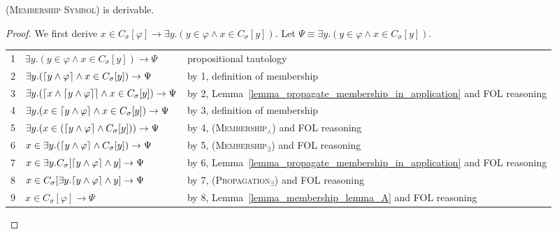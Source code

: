 \documentclass[acmsmall]{acmart}
\theoremstyle{acmdefinition}
\newcommand{\imp}{\to}
\newcommand{\CSub}[1]{C_{#1}}
\newcommand{\Csigmaapp}[1]{\CSub{\sigma}[#1]}
\newcommand{\prule}[1]{\textsc{(#1)}}
\newcommand{\propagationexists}{\prule{Propagation$_\exists$}\xspace}
\newcommand{\membershipwedge}{\prule{Membership$_\wedge$}\xspace}
\newcommand{\membershipexists}{\prule{Membership$_\exists$}\xspace}
\newcommand{\membershipsymbol}{\prule{Membership Symbol}\xspace}
\DeclarePairedDelimiter{\ceil}{\lceil}{\rceil}
\begin{document}
\begin{comment}

\begin{lemma}
\label{lemma_definedness_lemma_B}
For any pattern set $\Gamma$, any symbol $\sigma$, and pattern $\varphi$,
$\Gamma \vdash 
  \Csigmaapp{\ceil{y \wedge \varphi} \wedge y} =
  \Csigmaapp{y} \wedge \ceil{y \wedge \varphi}$,
where $y$ does not occur free in $\varphi$.
\end{lemma}
\begin{proof}
We first derive
$\Csigmaapp{\ceil{y \wedge \varphi} \wedge y} \imp
  \Csigmaapp{y} \wedge \ceil{y \wedge \varphi}$.
\todo[inline]{Finish this proof.}
\end{proof}

\end{comment}

\begin{lemma}
\membershipsymbol is derivable.
\end{lemma}
\begin{proof}
We first derive
$ x \in \Csigmaapp{\varphi} 
\imp \exists y . ( y \in \varphi \wedge x \in \Csigmaapp{y} ) $.
Let
$\Psi \equiv \exists y . ( y \in \varphi \wedge x \in \Csigmaapp{y} )$.
\begin{center}
\begin{tabular}{l|ll}
1 & $\exists y . ( y \in \varphi \wedge x \in \Csigmaapp{y} ) \imp \Psi$ 
  & propositional tautology \\
2 & $\exists y . ( \ceil{y \wedge \varphi} \wedge x \in \Csigmaapp{y} ) \imp 
\Psi$
  & by 1, definition of membership \\
3 & $\exists y . ( \ceil{x \wedge \ceil{y \wedge \varphi}} \wedge x \in 
\Csigmaapp{y} ) 
     \imp \Psi$
  & by 2, Lemma~\ref{lemma_propagate_membership_in_application}
          and FOL reasoning \\
4 & $\exists y . ( x \in \ceil{y \wedge \varphi} \wedge x \in \Csigmaapp{y} ) 
     \imp \Psi$
  & by 3, definition of membership \\
5 & $\exists y . ( x \in (\ceil{y \wedge \varphi} \wedge \Csigmaapp{y}) ) \imp 
\Psi$
  & by 4, \membershipwedge and FOL reasoning \\
6 & $ x \in \exists y . (\ceil{y \wedge \varphi} \wedge \Csigmaapp{y})  \imp 
\Psi$
  & by 5, \membershipexists and FOL reasoning \\
7 & $ x \in \exists y . \Csigmaapp{\ceil{y \wedge \varphi} \wedge y}  \imp \Psi$
  & by 6, Lemma~\ref{lemma_propagate_membership_in_application}
          and FOL reasoning \\
8 & $ x \in \Csigmaapp{\exists y . \ceil{y \wedge \varphi} \wedge y}  \imp \Psi$
  & by 7, \propagationexists and FOL reasoning \\
9 & $ x \in \Csigmaapp{\varphi}  \imp \Psi$
  & by 8, Lemma~\ref{lemma_membership_lemma_A} and FOL reasoning
\end{tabular}
\end{center}
\end{proof}
\end{document}
